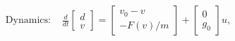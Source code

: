 \documentclass[preview]{standalone}
\begin{document}
\begin{align*}
\text{Dynamics: } & \frac{d}{dt}\begin{bmatrix}d\\ v\end{bmatrix} = \begin{bmatrix}v_0 - v\\ -F(v)/m\end{bmatrix} + \begin{bmatrix}0\\g_0\end{bmatrix}u, \\
\end{align*}
\end{document}
